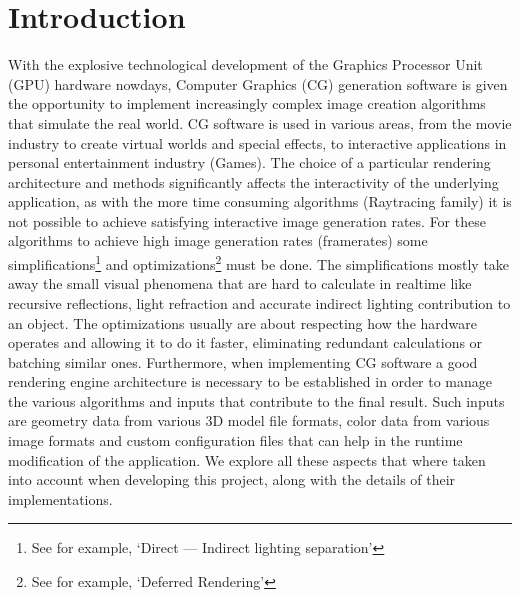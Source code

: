 \section{Introduction}
With the explosive technological development of the Graphics Processor Unit (GPU) hardware nowdays,
Computer Graphics (CG) generation software is given the opportunity to implement increasingly complex image
creation algorithms that simulate the real world. CG software is used in various areas, from the movie
industry to create virtual worlds and special effects, to interactive applications in personal entertainment
industry (Games). The choice of a particular rendering architecture and methods significantly affects
the interactivity of the underlying application, as with the more time consuming algorithms
(Raytracing family) it is not possible to achieve satisfying interactive image
generation rates. For these algorithms to achieve high image generation rates (framerates) some
simplifications\footnote{See for example, `Direct --- Indirect lighting separation'} and optimizations\footnote{See
for example, `Deferred Rendering'} must be done. The simplifications mostly take away the small visual phenomena
that are hard to calculate in realtime like recursive reflections, light refraction and accurate indirect lighting
contribution to an object. The optimizations usually are about respecting how the hardware operates and allowing
it to do it faster, eliminating redundant calculations or batching similar ones. Furthermore, when implementing CG
software a good rendering engine architecture is necessary to be established in order to manage the various algorithms and inputs
that contribute to the final result. Such inputs are geometry data from various 3D model file formats, color data
from various image formats and custom configuration files that can help in the runtime modification
of the application. We explore all these aspects that where taken into account when developing this
project, along with the details of their implementations.
